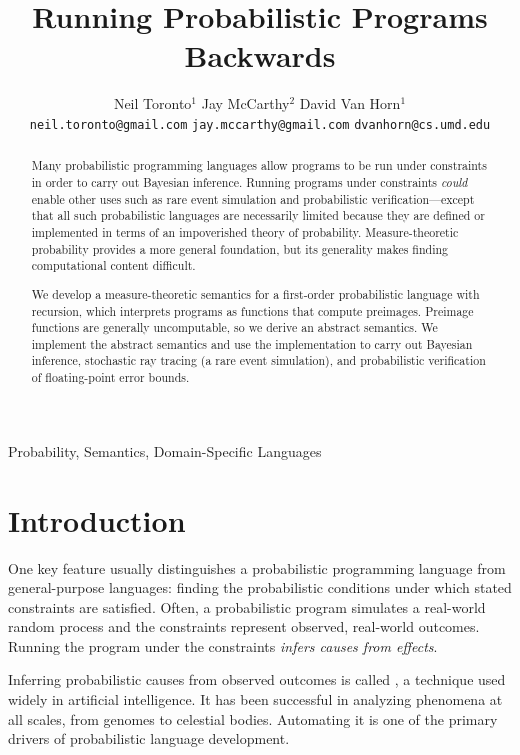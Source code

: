 \documentclass{llncs}
\title{Running Probabilistic Programs Backwards}
\author{\tab\tab Neil Toronto$^1$ \tab\tab\tab\tab\tab Jay McCarthy$^2$ \tab\tab\tab David Van Horn$^1$ \\
\footnotesize{\texttt{neil.toronto@gmail.com} \tab \texttt{jay.mccarthy@gmail.com} \tab \texttt{dvanhorn@cs.umd.edu}}}
\institute{$^1$University of Maryland, College Park \tab $^2$Vassar College}
\date{}
\begin{document}
\maketitle

\begin{abstract}
Many probabilistic programming languages allow programs to be run under constraints in order to carry out Bayesian inference.
Running programs under constraints \emph{could} enable other uses such as rare event simulation and probabilistic verification---except that all such probabilistic languages are necessarily limited because they are defined or implemented in terms of an impoverished theory of probability.
Measure-theoretic probability provides a more general foundation, but its generality makes finding computational content difficult.

We develop a measure-theoretic semantics for a first-order probabilistic language with recursion, which interprets programs as functions that compute preimages.
Preimage functions are generally uncomputable, so we derive an abstract semantics.
We implement the abstract semantics and use the implementation to carry out Bayesian inference, stochastic ray tracing (a rare event simulation), and probabilistic verification of floating-point error bounds.
\end{abstract}

\keywords Probability, Semantics, Domain-Specific Languages



\section{Introduction}

One key feature usually distinguishes a probabilistic programming language from general-purpose languages: finding the probabilistic conditions under which stated constraints are satisfied.
Often, a probabilistic program simulates a real-world random process and the constraints represent observed, real-world outcomes.
Running the program under the constraints \emph{infers causes from effects}.

Inferring probabilistic causes from observed outcomes is called , a technique used widely in artificial intelligence.
It has been successful in analyzing phenomena at all scales, from genomes to celestial bodies.
Automating it is one of the primary drivers of probabilistic language development.
\end{document}
